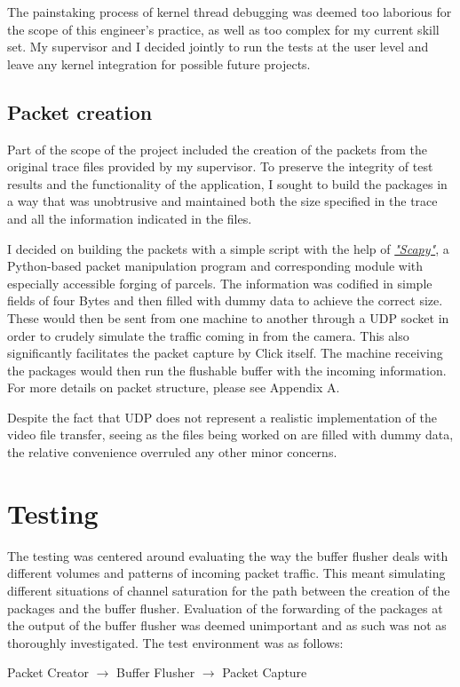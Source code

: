 The painstaking process of kernel thread debugging was deemed too laborious for the scope of this engineer's practice, as well as too complex for my current skill set. My supervisor and I decided jointly to run the tests at the user level and leave any kernel integration for possible future projects.

\section{Packet creation}

Part of the scope of the project included the creation of the packets from the original trace files provided by my supervisor. To preserve the integrity of test results and the functionality of the application, I sought to build the packages in a way that was unobtrusive and maintained both the size specified in the trace and all the information indicated in the files. 

I decided on building the packets with a simple script with the help of \href{http://www.secdev.org/projects/scapy/}{\textit{"Scapy"}}, a Python-based packet manipulation program and corresponding module with especially accessible forging of parcels. The information was codified in simple fields of four Bytes and then filled with dummy data to achieve the correct size. These would then be sent from one machine to another through a UDP socket in order to crudely simulate the traffic coming in from the camera. This also significantly facilitates the packet capture by Click itself. The machine receiving the packages would then run the flushable buffer with the incoming information. For more details on packet structure, please see Appendix A.

Despite the fact that UDP does not represent a realistic implementation of the video file transfer, seeing as the files being worked on are filled with dummy data, the relative convenience overruled any other minor concerns. 

\chapter{Testing}

The testing was centered around evaluating the way the buffer flusher deals with different volumes and patterns of incoming packet traffic. This meant simulating different situations of channel saturation for the path between the creation of the packages and the buffer flusher. Evaluation of the forwarding of the packages at the output of the buffer flusher was deemed unimportant and as such was not as thoroughly investigated. The test environment was as follows:
\vspace{3mm}
\begin{center}
Packet Creator \textcolor{cadmiumgreen}{$\rightarrow$} Buffer Flusher \textcolor{amaranth}{$\rightarrow$} Packet Capture
\end{center}
\vspace{3mm}

